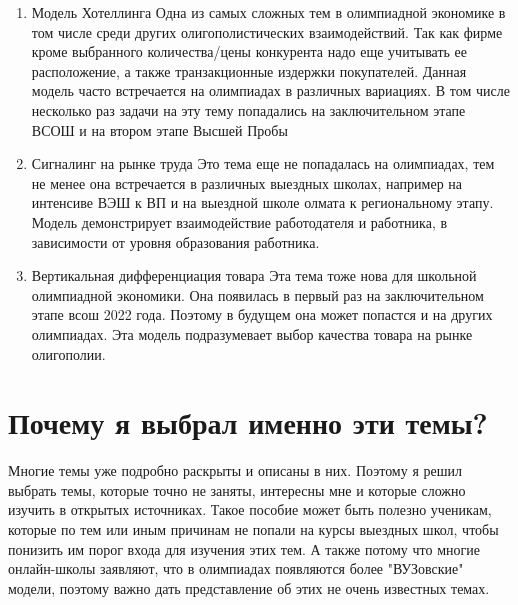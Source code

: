 \begin{enumerate}
    \item Модель Хотеллинга Одна из самых сложных тем в олимпиадной экономике в том числе среди других
    олигополистических взаимодействий. Так как фирме кроме выбранного количества/цены конкурента надо еще учитывать
    ее расположение, а также  транзакционные издержки покупателей. Данная модель часто встречается на олимпиадах в
    различных вариациях. В том числе несколько раз задачи на эту тему попадались на заключительном этапе ВСОШ и на
    втором этапе Высшей Пробы
    \item Сигналинг на рынке труда Это тема еще не попадалась на олимпиадах,
    тем не менее она встречается в различных выездных школах, например
    на интенсиве ВЭШ к ВП и на выездной школе олмата к региональному
    этапу. Модель демонстрирует взаимодействие работодателя и работника, в
    зависимости от уровня образования работника.
    \item Вертикальная дифференциация товара Эта тема тоже нова для школьной олимпиадной экономики. Она появилась в
    первый раз на заключительном этапе всош 2022 года. Поэтому в будущем она может попастся и на других олимпиадах.
    Эта модель подразумевает выбор качества товара на рынке олигополии.
\end{enumerate}

\section{Почему я выбрал именно эти темы?}
Многие темы уже подробно раскрыты и описаны в них. Поэтому я решил выбрать темы, которые точно не заняты, интересны
мне и которые сложно изучить в открытых источниках. Такое пособие может быть полезно ученикам, которые по тем или
иным причинам не попали на курсы выездных школ, чтобы понизить им порог входа для изучения этих тем. А также потому
что многие онлайн-школы заявляют, что в олимпиадах появляются более "ВУЗовские" модели, поэтому важно дать
представление об этих не очень известных темах.

